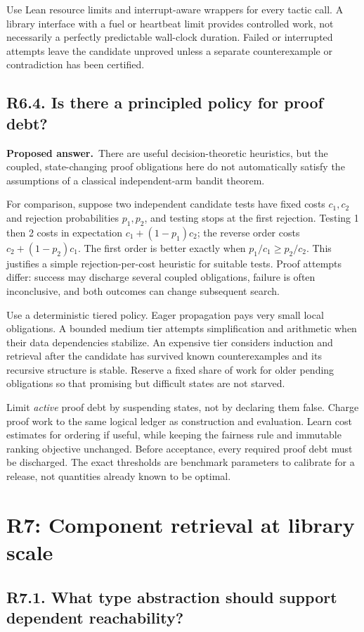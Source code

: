 \documentclass[11pt,a4paper]{article}
\newcommand{\question}[2]{\subsection{#1. #2}\label{q:#1}}
\newcommand{\answer}{\textbf{Proposed answer.}\ }
\theoremstyle{remark}
\begin{document}
Use Lean resource limits and interrupt-aware wrappers for every tactic call.
A library interface with a fuel or heartbeat limit provides controlled
work, not necessarily a perfectly predictable wall-clock duration. Failed
or interrupted attempts leave the candidate unproved unless a separate
counterexample or contradiction has been certified.

\question{R6.4}{Is there a principled policy for proof debt?}

\answer There are useful decision-theoretic heuristics, but the coupled,
state-changing proof obligations here do not automatically satisfy the
assumptions of a classical independent-arm bandit theorem.

For comparison, suppose two independent candidate tests have fixed costs
$c_1,c_2$ and rejection probabilities $p_1,p_2$, and testing stops at the
first rejection. Testing 1 then 2 costs in expectation
$c_1+(1-p_1)c_2$; the reverse order costs $c_2+(1-p_2)c_1$. The first order is
better exactly when $p_1/c_1\geq p_2/c_2$. This justifies a simple
rejection-per-cost heuristic for suitable tests. Proof attempts differ:
success may discharge several coupled obligations, failure is often
inconclusive, and both outcomes can change subsequent search.

Use a deterministic tiered policy. Eager propagation pays very small local
obligations. A bounded medium tier attempts simplification and arithmetic
when their data dependencies stabilize. An expensive tier considers induction
and retrieval after the candidate has survived known counterexamples and
its recursive structure is stable. Reserve a fixed share of work for older
pending obligations so that promising but difficult states are not starved.

Limit \emph{active} proof debt by suspending states, not by declaring them
false. Charge proof work to the same logical ledger as construction and
evaluation. Learn cost estimates for ordering if useful, while keeping the
fairness rule and immutable ranking objective unchanged. Before acceptance,
every required proof debt must be discharged. The exact thresholds are
benchmark parameters to calibrate for a release, not quantities already
known to be optimal.

\section{R7: Component retrieval at library scale}
\label{sec:r7}

\question{R7.1}{What type abstraction should support dependent reachability?}
\end{document}
